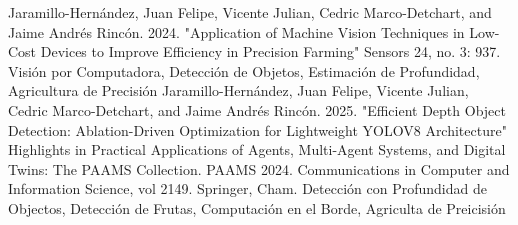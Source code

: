 %
%
%


\begin{scholarship}
	 {Jaramillo-Hernández, Juan Felipe, Vicente Julian, Cedric Marco-Detchart, and Jaime Andrés Rincón. 2024. "Application of Machine Vision Techniques in Low-Cost Devices to Improve Efficiency in Precision Farming" Sensors 24, no. 3: 937. \href{https://doi.org/10.3390/s24030937}{\color{CadetBlue}{https://doi.org/10.3390/s24030937}}}{Visión por Computadora, Detección de Objetos, Estimación de Profundidad, Agricultura de Precisión}
	 {Jaramillo-Hernández, Juan Felipe, Vicente Julian, Cedric Marco-Detchart, and Jaime Andrés Rincón. 2025. "Efficient Depth Object Detection: Ablation-Driven Optimization for Lightweight YOLOV8 Architecture" Highlights in Practical Applications of Agents, Multi-Agent Systems, and Digital Twins: The PAAMS Collection. PAAMS 2024. Communications in Computer and Information Science, vol 2149. Springer, Cham. \href{https://doi.org/10.1007/978-3-031-73058-0_13}{\color{CadetBlue}{https://doi.org/10.1007/978-3-031-73058-0\_13}}}
    {Detección con Profundidad de Objectos, Detección de Frutas, Computación en el Borde, Agriculta de Preicisión}           
\end{scholarship}